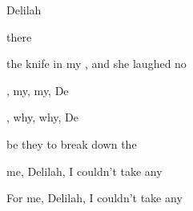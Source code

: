 \begin{SBSong}{Delilah}
\begin{SBVerse}
      there 

     the knife in my , and she laughed no  
  \end{SBVerse}
  \begin{SBVerse}
    , my, my, De

    , why, why, De

     be they  to break down the 

     me, Delilah, I  couldn't take any  

    For me, Delilah, I  couldn't take any 
  \end{SBVerse}
\end{SBSong}

